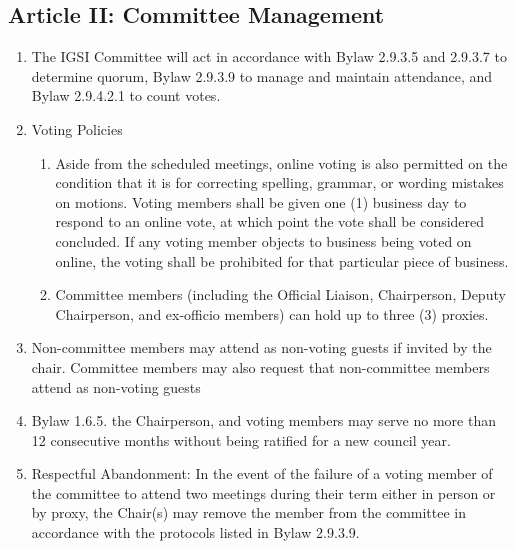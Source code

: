 \subsection{Article II: Committee Management}
\begin{enumerate}[label*=\arabic*., align=left]
\item The IGSI Committee will act in accordance with Bylaw 2.9.3.5 and 2.9.3.7 to determine quorum, Bylaw 2.9.3.9 to manage and maintain attendance, and Bylaw 2.9.4.2.1 to count votes.
\item Voting Policies
\begin{enumerate}[label*=\arabic*., align=left]
\item Aside from the scheduled meetings, online voting is also permitted on the condition that it is for correcting spelling, grammar, or wording mistakes on motions. Voting members shall be given one (1) business day to respond to an online vote, at which point the vote shall be considered concluded. If any voting member objects to business being voted on online, the voting shall be prohibited for that particular piece of business.
\item Committee members (including the Official Liaison, Chairperson, Deputy Chairperson, and ex-officio members) can hold up to three (3) proxies.
\end{enumerate}
\item Non-committee members may attend as non-voting guests if invited by the chair. Committee members may also request that non-committee members attend as non-voting guests
\item Bylaw 1.6.5. the Chairperson, and voting members may serve no more than 12 consecutive months without being ratified for a new council year.
\item Respectful Abandonment: In the event of the failure of a voting member of the committee to attend two meetings during their term either in person or by proxy, the Chair(s) may remove the member from the committee in accordance with the protocols listed in Bylaw 2.9.3.9.
\end{enumerate}

